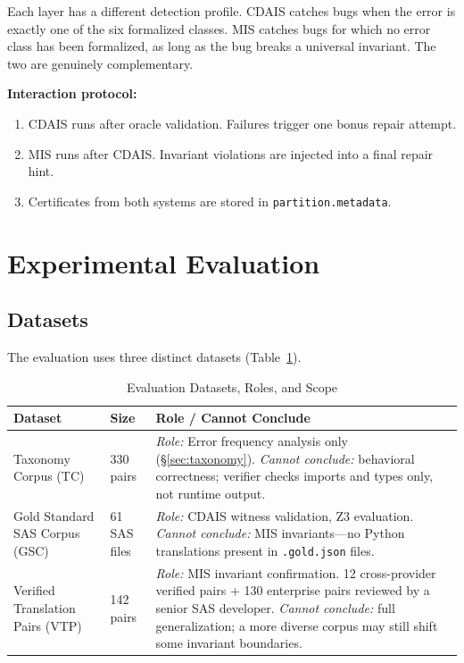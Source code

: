 \documentclass[conference]{IEEEtran}
\begin{document}
Each layer has a different detection profile. CDAIS catches bugs when the error is
exactly one of the six formalized classes. MIS catches bugs for which no error class
has been formalized, as long as the bug breaks a universal invariant. The two are
genuinely complementary.

\textbf{Interaction protocol:}
\begin{enumerate}
  \item CDAIS runs after oracle validation. Failures trigger one bonus repair attempt.
  \item MIS runs after CDAIS. Invariant violations are injected into a final repair hint.
  \item Certificates from both systems are stored in \texttt{partition.metadata}.
\end{enumerate}


\section{Experimental Evaluation}
\label{sec:eval}

\subsection{Datasets}
\label{sec:dataset}

The evaluation uses three distinct datasets (Table~\ref{tab:datasets}).

\begin{table}[t]
  \caption{Evaluation Datasets, Roles, and Scope}
  \label{tab:datasets}
  \centering
  \scriptsize
  \begin{tabularx}{\columnwidth}{@{}l l X@{}}
    \toprule
    \textbf{Dataset} & \textbf{Size} & \textbf{Role / Cannot Conclude} \\
    \midrule
    Taxonomy Corpus (TC)
      & 330 pairs
      & \textit{Role:} Error frequency analysis only (\S\ref{sec:taxonomy}).
        \textit{Cannot conclude:} behavioral correctness; verifier checks
        imports and types only, not runtime output. \\
    Gold Standard SAS Corpus (GSC)
      & 61 SAS files
      & \textit{Role:} CDAIS witness validation, Z3 evaluation.
        \textit{Cannot conclude:} MIS invariants—no Python translations
        present in \texttt{.gold.json} files. \\
    Verified Translation Pairs (VTP)
      & 142 pairs
      & \textit{Role:} MIS invariant confirmation.
        12 cross-provider verified pairs + 130 enterprise pairs
        reviewed by a senior SAS developer.
        \textit{Cannot conclude:} full generalization; a more diverse
        corpus may still shift some invariant boundaries. \\
    \bottomrule
  \end{tabularx}
\end{table}
\end{document}
